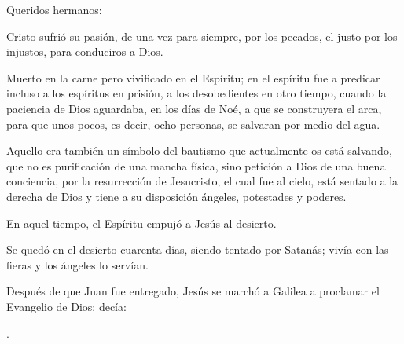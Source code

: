 
 


\begin{scripture}
Queridos hermanos:

Cristo sufrió su pasión, de una vez para siempre, por los pecados, el justo por los injustos, para conduciros a Dios.

Muerto en la carne pero vivificado en el Espíritu; en el espíritu fue a predicar incluso a los espíritus en prisión, a los desobedientes en otro tiempo, cuando la paciencia de Dios aguardaba, en los días de Noé, a que se construyera el arca, para que unos pocos, es decir, ocho personas, se salvaran por medio del agua.

Aquello era también un símbolo del bautismo que actualmente os está salvando, que no es purificación de una mancha física, sino petición a Dios de una buena conciencia, por la resurrección de Jesucristo, el cual fue al cielo, está sentado a la derecha de Dios y tiene a su disposición ángeles, potestades y poderes.
\end{scripture}

\newpage
{}

 


\begin{scripture}
En aquel tiempo, el Espíritu empujó a Jesús al desierto.

Se quedó en el desierto cuarenta días, siendo tentado por Satanás; vivía con las fieras y los ángeles lo servían.

Después de que Juan fue entregado, Jesús se marchó a Galilea a proclamar el Evangelio de Dios; decía:

.
\end{scripture}

